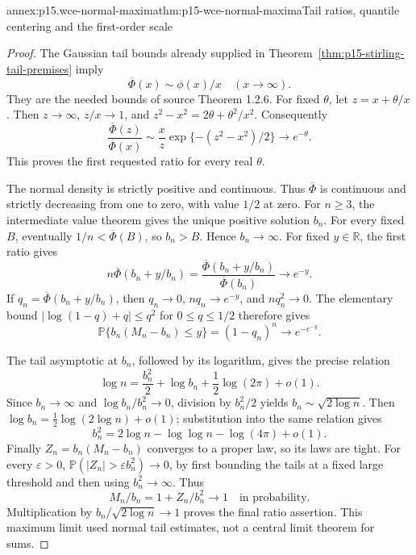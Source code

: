 \begin{annexitem}{annex:p15.wce-normal-maxima}{thm:p15-wce-normal-maxima}{Tail ratios, quantile centering and the first-order scale}
\begin{proof}
The Gaussian tail bounds already supplied in
Theorem~\ref{thm:p15-stirling-tail-premises} imply
\[
 \overline\Phi(x)\sim\phi(x)/x\quad(x\to\infty).
 \]
They are the needed bounds of source Theorem 1.2.6.
For fixed \(\theta\), let \(z=x+\theta/x\).
Then \(z\to\infty\), \(z/x\to1\), and
\(z^2-x^2=2\theta+\theta^2/x^2\).
Consequently
\[
 \frac{\overline\Phi(z)}{\overline\Phi(x)}
 \sim\frac{x}{z}\exp\{-(z^2-x^2)/2\}
                         \longrightarrow e^{-\theta}.
 \]
This proves the first requested ratio for every real \(\theta\).

The normal density is strictly positive and continuous.
Thus \(\overline\Phi\) is continuous and strictly decreasing
from one to zero, with value \(1/2\) at zero.
For \(n\geq3\), the intermediate value theorem gives the
unique positive solution \(b_n\).
For every fixed \(B\), eventually \(1/n<\overline\Phi(B)\),
so \(b_n>B\). Hence \(b_n\to\infty\).
For fixed \(y\in\mathbb R\), the first ratio gives
\[
 n\overline\Phi(b_n+y/b_n)
  =\frac{\overline\Phi(b_n+y/b_n)}{\overline\Phi(b_n)}
                                      \longrightarrow e^{-y}.
 \]
If \(q_n=\overline\Phi(b_n+y/b_n)\), then \(q_n\to0\),
\(nq_n\to e^{-y}\), and \(nq_n^2\to0\).
The elementary bound
\(|\log(1-q)+q|\leq q^2\) for \(0\leq q\leq1/2\)
therefore gives
\[
 \mathbb P\{b_n(M_n-b_n)\leq y\}
  =(1-q_n)^n\longrightarrow e^{-e^{-y}}.
 \]

The tail asymptotic at \(b_n\), followed by its logarithm,
gives the precise relation
\[
 \log n=\frac{b_n^2}{2}+\log b_n
                         +\frac12\log(2\pi)+o(1).
 \]
Since \(b_n\to\infty\) and \(\log b_n/b_n^2\to0\), division
by \(b_n^2/2\) yields \(b_n\sim\sqrt{2\log n}\).
Then \(\log b_n=\tfrac12\log(2\log n)+o(1)\);
substitution into the same relation gives
\[
 b_n^2=2\log n-\log\log n-\log(4\pi)+o(1).
 \]
Finally \(Z_n=b_n(M_n-b_n)\) converges to a proper law,
so its laws are tight. For every \(\varepsilon>0\),
\(\mathbb P(|Z_n|>\varepsilon b_n^2)\to0\), by first
bounding the tails at a fixed large threshold and then using
\(b_n^2\to\infty\). Thus
\[
 M_n/b_n=1+Z_n/b_n^2\longrightarrow1
                                      \quad\text{in probability}.
 \]
Multiplication by \(b_n/\sqrt{2\log n}\to1\) proves the final
ratio assertion. This maximum limit used normal tail estimates,
not a central limit theorem for sums.
\end{proof}
\end{annexitem}

